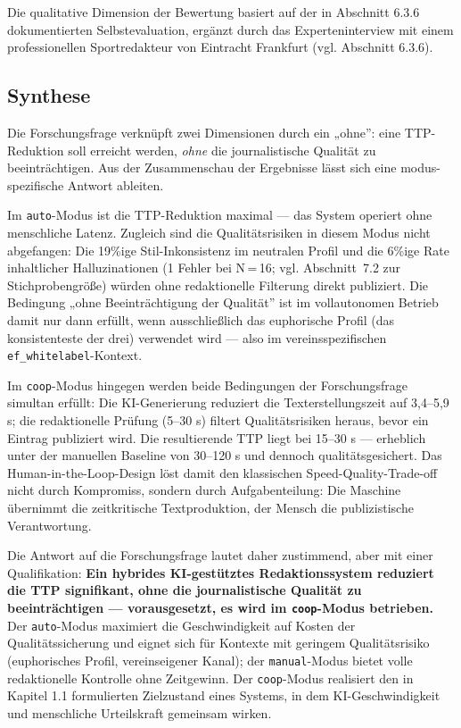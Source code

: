 Die qualitative Dimension der Bewertung basiert auf der in Abschnitt
6.3.6 dokumentierten Selbstevaluation, ergänzt durch das
Experteninterview mit einem professionellen Sportredakteur von Eintracht
Frankfurt (vgl. Abschnitt 6.3.6).

\subsection{Synthese}\label{synthese}

Die Forschungsfrage verknüpft zwei Dimensionen durch ein „ohne'': eine
TTP-Reduktion soll erreicht werden, \emph{ohne} die journalistische
Qualität zu beeinträchtigen. Aus der Zusammenschau der Ergebnisse lässt
sich eine modus-spezifische Antwort ableiten.

Im \texttt{auto}-Modus ist die TTP-Reduktion maximal --- das System
operiert ohne menschliche Latenz. Zugleich sind die Qualitätsrisiken in
diesem Modus nicht abgefangen: Die 19\%ige Stil-Inkonsistenz im
neutralen Profil und die 6\%ige Rate inhaltlicher Halluzinationen
(1 Fehler bei N\,=\,16; vgl. Abschnitt~7.2 zur Stichprobengröße)
würden ohne redaktionelle Filterung direkt publiziert. Die Bedingung „ohne
Beeinträchtigung der Qualität'' ist im vollautonomen Betrieb damit nur
dann erfüllt, wenn ausschließlich das euphorische Profil (das
konsistenteste der drei) verwendet wird --- also im vereinsspezifischen
\texttt{ef\_whitelabel}-Kontext.

Im \texttt{coop}-Modus hingegen werden beide Bedingungen der
Forschungsfrage simultan erfüllt: Die KI-Generierung reduziert die
Texterstellungszeit auf 3,4--5,9 s; die redaktionelle Prüfung (5--30 s)
filtert Qualitätsrisiken heraus, bevor ein Eintrag publiziert wird. Die
resultierende TTP liegt bei 15--30 s --- erheblich unter der manuellen
Baseline von 30--120 s und dennoch qualitätsgesichert. Das
Human-in-the-Loop-Design löst damit den klassischen
Speed-Quality-Trade-off nicht durch Kompromiss, sondern durch
Aufgabenteilung: Die Maschine übernimmt die zeitkritische
Textproduktion, der Mensch die publizistische Verantwortung.

Die Antwort auf die Forschungsfrage lautet daher zustimmend, aber mit
einer Qualifikation: \textbf{Ein hybrides KI-gestütztes Redaktionssystem
reduziert die TTP signifikant, ohne die journalistische Qualität zu
beeinträchtigen --- vorausgesetzt, es wird im \texttt{coop}-Modus
betrieben.} Der \texttt{auto}-Modus maximiert die Geschwindigkeit auf
Kosten der Qualitätssicherung und eignet sich für Kontexte mit geringem
Qualitätsrisiko (euphorisches Profil, vereinseigener Kanal); der
\texttt{manual}-Modus bietet volle redaktionelle Kontrolle ohne
Zeitgewinn. Der \texttt{coop}-Modus realisiert den in Kapitel 1.1
formulierten Zielzustand eines Systems, in dem KI-Geschwindigkeit und
menschliche Urteilskraft gemeinsam wirken.

